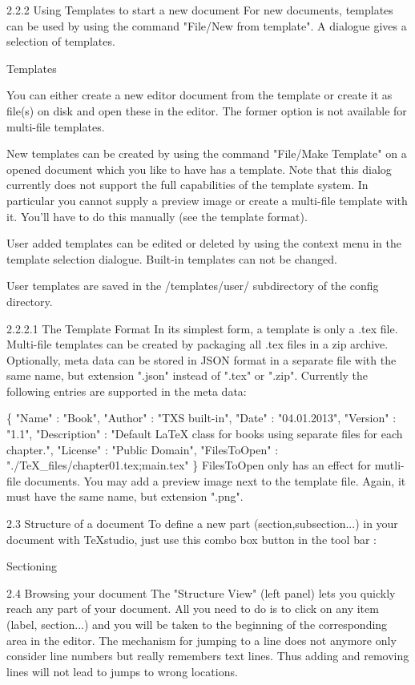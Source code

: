 \documentclass{article}
\begin{document}
	2.2.2 Using Templates to start a new document
	For new documents, templates can be used by using the command "File/New from template". A dialogue gives a selection of templates.
	
	Templates
	
	You can either create a new editor document from the template or create it as file(s) on disk and open these in the editor. The former option is not available for multi-file templates.
	
	New templates can be created by using the command "File/Make Template" on a opened document which you like to have has a template. Note that this dialog currently does not support the full capabilities of the template system. In particular you cannot supply a preview image or create a multi-file template with it. You'll have to do this manually (see the template format).
	
	User added templates can be edited or deleted by using the context menu in the template selection dialogue. Built-in templates can not be changed.
	
	User templates are saved in the /templates/user/ subdirectory of the config directory.
	
	2.2.2.1 The Template Format
	In its simplest form, a template is only a .tex file. Multi-file templates can be created by packaging all .tex files in a zip archive. Optionally, meta data can be stored in JSON format in a separate file with the same name, but extension ".json" instead of ".tex" or ".zip". Currently the following entries are supported in the meta data:
	
	\{
	"Name"        : "Book",
	"Author"      : "TXS built-in",
	"Date"        : "04.01.2013",
	"Version"     : "1.1",
	"Description" : "Default LaTeX class for books using separate files for each chapter.",
	"License"     : "Public Domain",
	"FilesToOpen" : "./TeX\_files/chapter01.tex;main.tex"
	\}
	FilesToOpen only has an effect for mutli-file documents. You may add a preview image next to the template file. Again, it must have the same name, but extension ".png".
	
	2.3 Structure of a document
	To define a new part (section,subsection...) in your document with TeXstudio, just use this combo box button in the tool bar :
	
	Sectioning
	
	2.4 Browsing your document
	The "Structure View" (left panel) lets you quickly reach any part of your document. All you need to do is to click on any item (label, section...) and you will be taken to the beginning of the corresponding area in the editor. The mechanism for jumping to a line does not anymore only consider line numbers but really remembers text lines. Thus adding and removing lines will not lead to jumps to wrong locations.
	
\end{document}
